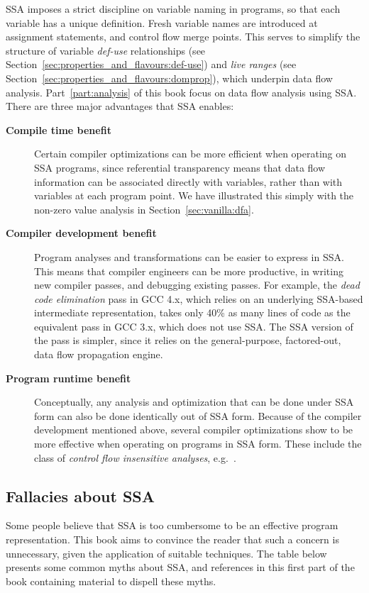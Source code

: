 SSA imposes a strict discipline on variable naming in programs,
so that each variable has a unique definition.
Fresh variable names are introduced at assignment statements,
and control flow merge points.
This serves to simplify the structure of variable \emph{def-use} 
relationships (see Section~\ref{sec:properties_and_flavours:def-use}) 
and \emph{live ranges} (see Section~\ref{sec:properties_and_flavours:domprop}),
which underpin data flow analysis. Part~\ref{part:analysis} of this book focus
on data flow analysis using SSA. There are three major advantages that SSA enables:
\begin{description}
\item[\textbf{Compile time benefit}]
Certain compiler optimizations can be more efficient
when operating on SSA programs, since
referential transparency means that data flow information
can be associated directly with variables, rather than with variables
at each program point. We have illustrated this simply with the
non-zero value analysis in Section~\ref{sec:vanilla:dfa}.
\item[\textbf{Compiler development benefit}]
Program analyses and transformations can be easier
to express in SSA. This means that compiler engineers
can be more productive, in writing new compiler passes,
and debugging existing passes.
For example, the \textit{dead code elimination} pass
in GCC 4.x, which relies on an underlying SSA-based intermediate
representation, takes only 40\% as many lines of code
as the equivalent pass in GCC 3.x, which does not use SSA.
The SSA version of the pass is simpler, since it
relies on the general-purpose, factored-out, data flow propagation
engine.
\item[\textbf{Program runtime benefit}]
Conceptually, any analysis and optimization that can be done under SSA form can also be done identically out of SSA form. Because of the compiler development mentioned above, several compiler optimizations show to be more effective
when operating on programs in SSA form. These include the
class of \textit{control flow insensitive analyses}, e.g.\
\cite{hasti98using}.
\end{description}


\vspace{-2ex}
\subsection{Fallacies about SSA}

Some people believe that SSA is too cumbersome to be an effective
program representation. 
This book aims to convince the reader that
such a concern is
unnecessary,
given the application of suitable techniques.
The table below presents some common myths
about SSA,
and references in this
first part of the book 
containing material to dispell
these myths.

